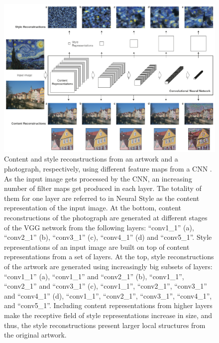 \begin{figure}[t]
  \includegraphics[width=\textwidth]{gfx/neural-style-cnn}
  \caption{
    Content and style reconstructions from an artwork and a photograph, respectively, using different feature maps from a CNN \cite{Gatys2015B}.
    As the input image gets processed by the CNN, an increasing number of filter maps get produced in each layer.
    The totality of them for one layer are referred to in Neural Style as the content representation of the input image.
    At the bottom, content reconstructions of the photograph are generated at different stages of the VGG network from the following layers: ``conv1\_1'' (a), ``conv2\_1'' (b), ``conv3\_1'' (c), ``conv4\_1'' (d) and ``conv5\_1''.
    Style representations of an input image are built on top of content representations from a set of layers.
    At the top, style reconstructions of the artwork are generated using increasingly big subsets of layers: ``conv1\_1'' (a), ``conv1\_1'' and ``conv2\_1'' (b), ``conv1\_1'', ``conv2\_1'' and ``conv3\_1'' (c), ``conv1\_1'', ``conv2\_1'', ``conv3\_1'' and ``conv4\_1'' (d), ``conv1\_1'', ``conv2\_1'', ``conv3\_1'', ``conv4\_1'', and ``conv5\_1''.
    Including content representations from higher layers make the receptive field of style representations increase in size, and thus, the style reconstructions present larger local structures from the original artwork.
  }
  \label{sub:system:method:reconstructions}
\end{figure}


